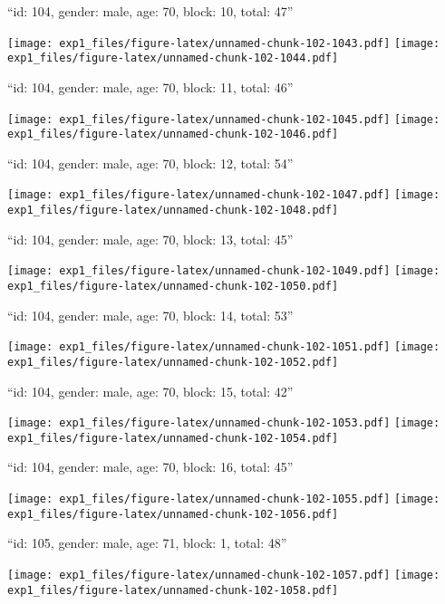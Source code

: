 \documentclass[11pt,,]{article}
\begin{document}
\newpage
[1] 

``id: 104, gender: male, age: 70, block: 10, total: 47''

\texttt{[image: exp1\_files/figure-latex/unnamed-chunk-102-1043.pdf]}
\texttt{[image: exp1\_files/figure-latex/unnamed-chunk-102-1044.pdf]}

\newpage
[1] 

``id: 104, gender: male, age: 70, block: 11, total: 46''

\texttt{[image: exp1\_files/figure-latex/unnamed-chunk-102-1045.pdf]}
\texttt{[image: exp1\_files/figure-latex/unnamed-chunk-102-1046.pdf]}

\newpage
[1] 

``id: 104, gender: male, age: 70, block: 12, total: 54''

\texttt{[image: exp1\_files/figure-latex/unnamed-chunk-102-1047.pdf]}
\texttt{[image: exp1\_files/figure-latex/unnamed-chunk-102-1048.pdf]}

\newpage
[1] 

``id: 104, gender: male, age: 70, block: 13, total: 45''

\texttt{[image: exp1\_files/figure-latex/unnamed-chunk-102-1049.pdf]}
\texttt{[image: exp1\_files/figure-latex/unnamed-chunk-102-1050.pdf]}

\newpage
[1] 

``id: 104, gender: male, age: 70, block: 14, total: 53''

\texttt{[image: exp1\_files/figure-latex/unnamed-chunk-102-1051.pdf]}
\texttt{[image: exp1\_files/figure-latex/unnamed-chunk-102-1052.pdf]}

\newpage
[1] 

``id: 104, gender: male, age: 70, block: 15, total: 42''

\texttt{[image: exp1\_files/figure-latex/unnamed-chunk-102-1053.pdf]}
\texttt{[image: exp1\_files/figure-latex/unnamed-chunk-102-1054.pdf]}

\newpage
[1] 

``id: 104, gender: male, age: 70, block: 16, total: 45''

\texttt{[image: exp1\_files/figure-latex/unnamed-chunk-102-1055.pdf]}
\texttt{[image: exp1\_files/figure-latex/unnamed-chunk-102-1056.pdf]}

\newpage
[1] 

``id: 105, gender: male, age: 71, block: 1, total: 48''

\texttt{[image: exp1\_files/figure-latex/unnamed-chunk-102-1057.pdf]}
\texttt{[image: exp1\_files/figure-latex/unnamed-chunk-102-1058.pdf]}
\end{document}
